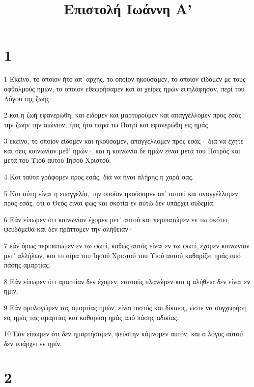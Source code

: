 

\title{Επιστολή Ιωάννη Α'}


\chapter{1}

\par 1 Εκείνο, το οποίον ήτο απ' αρχής, το οποίον ηκούσαμεν, το οποίον είδομεν με τους οφθαλμούς ημών, το οποίον εθεωρήσαμεν και αι χείρες ημών εψηλάφησαν, περί του Λόγου της ζωής·
\par 2 και η ζωή εφανερώθη, και είδομεν και μαρτυρούμεν και απαγγέλλομεν προς εσάς την ζωήν την αιώνιον, ήτις ήτο παρά τω Πατρί και εφανερώθη εις ημάς
\par 3 εκείνο, το οποίον είδομεν και ηκούσαμεν, απαγγέλλομεν προς εσάς· διά να έχητε και σεις κοινωνίαν μεθ' ημών· και η κοινωνία δε ημών είναι μετά του Πατρός και μετά του Υιού αυτού Ιησού Χριστού.
\par 4 Και ταύτα γράφομεν προς εσάς, διά να ήναι πλήρης η χαρά σας.
\par 5 Και αύτη είναι η επαγγελία, την οποίαν ηκούσαμεν απ' αυτού και αναγγέλλομεν προς εσάς, ότι ο Θεός είναι φως και σκοτία εν αυτώ δεν υπάρχει ουδεμία.
\par 6 Εάν είπωμεν ότι κοινωνίαν έχομεν μετ' αυτού και περιπατώμεν εν τω σκότει, ψευδόμεθα και δεν πράττομεν την αλήθειαν·
\par 7 εάν όμως περιπατώμεν εν τω φωτί, καθώς αυτός είναι εν τω φωτί, έχομεν κοινωνίαν μετ' αλλήλων, και το αίμα του Ιησού Χριστού του Υιού αυτού καθαρίζει ημάς από πάσης αμαρτίας.
\par 8 Εάν είπωμεν ότι αμαρτίαν δεν έχομεν, εαυτούς πλανώμεν και η αλήθεια δεν είναι εν ημίν.
\par 9 Εάν ομολογώμεν τας αμαρτίας ημών, είναι πιστός και δίκαιος, ώστε να συγχωρήση εις ημάς τας αμαρτίας και καθαρίση ημάς από πάσης αδικίας.
\par 10 Εάν είπωμεν ότι δεν ημαρτήσαμεν, ψεύστην κάμνομεν αυτόν, και ο λόγος αυτού δεν υπάρχει εν ημίν.

\chapter{2}

